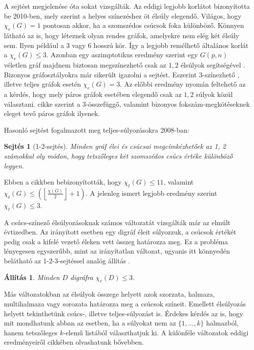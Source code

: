 \documentclass[12pt, a4paper]{report}
\newtheorem{áll}[tét]{Állítás}
\newtheorem{sej}[tét]{Sejtés}
\theoremstyle{remark}
\theoremstyle{definition}
\begin{document}
A sejtést megjelenése óta sokat vizsgálták. Az eddigi legjobb korlátot \citeauthor{Kalkowski2010} \cite{Kalkowski2010} bizonyította be 2010-ben, mely szerint a helyes színezéshez öt élsúly elegendő. Világos, hogy $\chi_e(G) = 1$ pontosan akkor, ha a szomszédos csúcsok foka különböző. Könnyen látható az is, hogy léteznek olyan rendes gráfok, amelyekre nem elég két élsúly sem. Ilyen például a $3$ vagy $6$ hosszú kör. Így a legjobb remélhető általános korlát a $\chi_e(G) \leq 3$. Azonban egy aszimptotikus eredmény szerint egy $G(p, n)$ véletlen gráf majdnem biztosan megszínezhető csak az $1, 2$ élsúlyok segítségével \cite{AddarioBerry2008}. Bizonyos gráfosztályokra már sikerült igazolni a sejtést. Eszerint $3$-színezhető \cite{Karonski2004}, illetve teljes gráfok \cite{Alaeiyan2012} esetén $\chi_e(G) = 3$. Az előbbi eredmény nyomán feltehető az a kérdés, hogy mely páros gráfok esetében elegendő csak az $1, 2$ súlyok közül választani. \citeauthor{Lu2011} \cite{Lu2011} cikke szerint a $3$-összefüggő, valamint bizonyos fokszám-megkötéseknek eleget tevő páros gráfok ilyenek.

Hasonló sejtést fogalmazott meg teljes-súlyozásokra \citeauthor{Przybylo2010} 2008-ban:

\begin{sej}[1-2-sejtés]
Minden gráf élei és csúcsai megcímkézhetőek az 1, 2 számokkal oly módon, hogy tetszőleges két szomszédos csúcs értéke különböző legyen.
\end{sej}

Ebben a cikkben bebizonyították, hogy $\chi_t(G) \leq 11$, valamint $\chi_t(G) \leq \left( \left\lfloor \frac{χ(G)}{2} \right\rfloor + 1 \right)$. A jelenleg ismert legjobb eredmény szerint $\chi_t(G) \leq 3$.

A csúcs-színező élsúlyozásoknak számos változatát vizsgálták már az elmúlt évtizedben. Az irányított esetben egy digráf éleit súlyozzuk, a csúcsok értékét pedig csak a kifelé vezető éleken vett összeg határozza meg. Ez a probléma lényegesen egyszerűbb, mint az irányítatlan változat, ugyanis itt könnyedén belátható az 1-2-3-sejtéssel analóg állítás \cite{Baudon2014}.

\begin{áll}
Minden $D$ digráfra $\chi_e(D) \leq 3$.
\end{áll}

Más változatokban az élsúlyok összege helyett azok szorzata, halmaza, multihalmaza vagy sorozata határozza meg a csúcsok színeit. Emellett élsúlyozás helyett tekinthetünk csúcs-, illetve teljes-súlyozást is. Érdekes kérdés az is, hogy mit mondhatunk abban az esetben, ha a súlyokat nem az $\lbrace 1, \ldots, k \rbrace$ halmazból, hanem tetszőleges $k$-elemű listából választhatjuk ki. A különféle változatok eddigi eredményeiről \citeauthor{Seamone2012} \cite{Seamone2012} cikkében olvashatunk bővebben.
\end{document}
